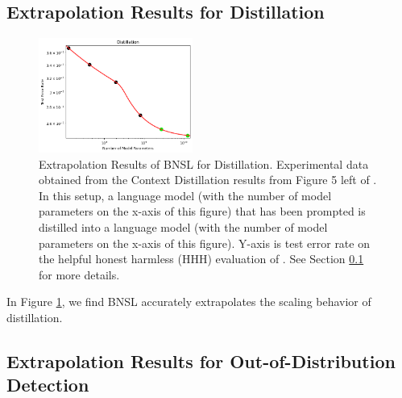\documentclass{article} %
\begin{document}
\vspace{5.0mm}

\subsection{Extrapolation Results for Distillation}
\label{section:distillation}

\begin{figure}[htbp]
    \centering
\includegraphics[width=0.45\textwidth]{figures/distillation/distillation.png}
    \caption{
Extrapolation Results of BNSL for Distillation. Experimental data obtained from the Context Distillation results from Figure 5 left of \cite{bai2022training}. In this setup, a language model (with the number of model parameters on the x-axis of this figure) that has been prompted is distilled into a language model (with the number of model parameters on the x-axis of this figure). Y-axis is test error rate on the helpful honest harmless (HHH) evaluation of \cite{askell2021general}. See Section \ref{section:distillation} for more details.
    }
    \label{fig:distillation}
\end{figure}

In Figure \ref{fig:distillation}, we find BNSL accurately extrapolates the scaling behavior of distillation.

\clearpage

\subsection{Extrapolation Results for Out-of-Distribution Detection}
\label{section:ood_detection}
\end{document}

